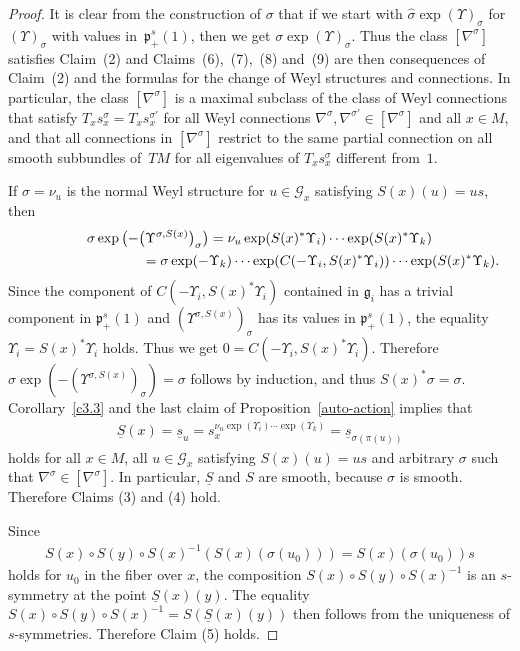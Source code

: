 \documentclass[10pt,a4paper]{amsart}
\newcommand{\si}{\sigma}
\newcommand{\un}{\underline}
\newcommand{\ba}{\mathcal{G}}
\newcommand{\fg}{\mathfrak g}
\newcommand{\fp}{\mathfrak p}
\newcommand{\U}{\Upsilon}
\numberwithin{equation}{section}
\begin{document}
\begin{proof}
It is clear from the construction of $\si$ that if we start with $\hat \si\exp (\U)_\si$ for $(\U)_\si$ with values in~$\fp^s_+(1)$, then we get $\si\exp(\U)_\si.$ Thus the class $[\nabla^\si]$ satisf\/ies Claim~(2) and Claims~(6),~(7),~(8) and~(9) are then consequences of Claim~(2) and the formulas for the change of Weyl structures and connections. In particular, the class $[\nabla^\si]$ is a maximal subclass of the class of Weyl connections that satisfy $T_xs_x^{\si}=T_xs_x^{\si'}$ for all Weyl connections $\nabla^\si,\nabla^{\si'}\in [\nabla^\si]$ and all $x\in M$, and that all connections in $[\nabla^\si]$ restrict to the same partial connection on all smooth subbundles of~$TM$ for all eigenvalues of $T_xs_x^\si$ dif\/ferent from~$1$.

If $\hat \si=\nu_u$ is the normal Weyl structure for $u\in \ba_x$ satisfying $S(x)(u)=us$, then
\begin{gather*}
\si\exp\big({-}\big(\U^{\si,S(x)}\big)_\si\big)= \nu_u\exp(S(x)^*\U_i)\cdots \exp(S(x)^*\U_k)\\
\hphantom{\si\exp\big({-}\big(\U^{\si,S(x)}\big)_\si\big)}{}
= \si\exp(-\U_k)\cdots \exp(C(-\U_i,S(x)^*\U_i))\cdots \exp(S(x)^*\U_k).
\end{gather*}
Since the component of $C(-\U_i,S(x)^*\U_i)$ contained in $\fg_i$ has a trivial component in $\fp^s_+(1)$ and $(\U^{\si,S(x)})_\si$ has its values in $\fp^s_+(1)$, the equality $\U_i=S(x)^*\U_i$ holds. Thus we get $0=C(-\U_i,S(x)^*\U_i)$. Therefore $\si\exp(-(\U^{\si,S(x)})_\si)=\si$ follows by induction, and thus $S(x)^*\si=\si$. Corollary~\ref{c3.3} and the last claim of Proposition~\ref{auto-action} implies that
\begin{gather*}\un S(x)=\un s_u=s_x^{\nu_u\exp(\U_i)\cdots \exp(\U_k)}=\un s_{\si(\pi(u))}\end{gather*}
holds for all $x\in M$, all $u\in \ba_x$ satisfying $S(x)(u)=us$ and arbitrary $\si$ such that $\nabla^\si\in [\nabla^\si]$. In particular, $\un S$ and $S$ are smooth, because $\si$ is smooth. Therefore Claims (3) and (4) hold.

Since
\begin{gather*}S(x)\circ S(y)\circ S(x)^{-1}(S(x)(\si(u_0)))=S(x)(\si(u_0))s\end{gather*}
holds for $u_0$ in the f\/iber over $x$, the composition $S(x)\circ S(y)\circ S(x)^{-1}$ is an $s$-symmetry at the point $\un S(x)(y)$. The equality $S(x)\circ S(y)\circ S(x)^{-1}=S(\un S(x)(y))$ then follows from the uniqueness of $s$-symmetries. Therefore Claim (5) holds.


\end{proof}
\end{document}
